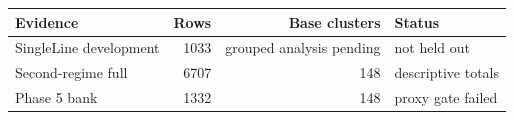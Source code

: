\begin{tabular}{lrrl}
\toprule
Evidence & Rows & Base clusters & Status \\
\midrule
SingleLine development & 1033 & grouped analysis pending & not held out \\
Second-regime full & 6707 & 148 & descriptive totals \\
Phase 5 bank & 1332 & 148 & proxy gate failed \\
\bottomrule
\end{tabular}
